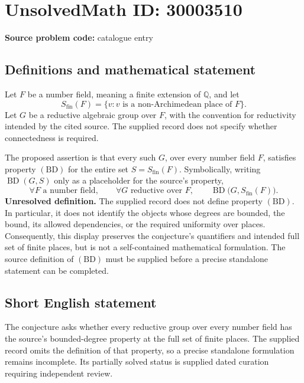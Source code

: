 \documentclass[11pt]{article}
\newcommand{\Q}{\mathbb{Q}}
\begin{document}
\section*{UnsolvedMath ID: 30003510}
\textbf{Source problem code:} catalogue entry
\subsection{Definitions and mathematical statement}
Let \(F\) be a number field, meaning a finite extension of \(\Q\), and let
\[
S_{\mathrm{fin}}(F)=\{v: v\text{ is a non-Archimedean place of }F\}.
\]
Let \(G\) be a reductive algebraic group over \(F\), with the convention for reductivity intended by the cited source. The supplied record does not specify whether connectedness is required.

The proposed assertion is that every such \(G\), over every number field \(F\), satisfies property \((\mathrm{BD})\) for the entire set \(S=S_{\mathrm{fin}}(F)\). Symbolically, writing \(\operatorname{BD}(G,S)\) only as a placeholder for the source's property,
\[
\forall F\text{ a number field},\qquad
\forall G\text{ reductive over }F,\qquad
\operatorname{BD}\bigl(G,S_{\mathrm{fin}}(F)\bigr).
\]
\textbf{Unresolved definition.} The supplied record does not define property \((\mathrm{BD})\). In particular, it does not identify the objects whose degrees are bounded, the bound, its allowed dependencies, or the required uniformity over places. Consequently, this display preserves the conjecture's quantifiers and intended full set of finite places, but is not a self-contained mathematical formulation. The source definition of \((\mathrm{BD})\) must be supplied before a precise standalone statement can be completed.
\subsection{Short English statement}
The conjecture asks whether every reductive group over every number field has the source's bounded-degree property at the full set of finite places. The supplied record omits the definition of that property, so a precise standalone formulation remains incomplete. Its partially solved status is supplied dated curation requiring independent review.
\end{document}
